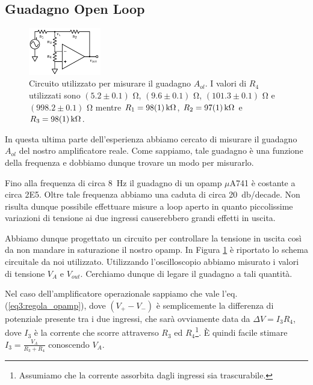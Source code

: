 \subsection{Guadagno Open Loop}
\label{par3:open}

\begin{figure}
  \begin{center}
    \includegraphics[width=0.280\textwidth]{../E03/latex/LF_ol.pdf}
  \end{center}
  \caption{Circuito utilizzato per misurare il guadagno $A_{ol}$. I valori di $R_4$ utilizzati sono $(5.2\pm 0.1)$ \si{\ohm},  $(9.6\pm0.1)$ \si{\ohm}, $(101.3\pm 0.1)$ \si{\ohm} e $(998.2\pm 0.1)$ \si{\ohm} mentre $R_1=\SI{98\pm1}{\kohm}$, $R_2=\SI{97\pm1}{\kohm}$ e $R_3=\SI{98\pm1}{\kohm}$.}
  \label{cir3:low_frequency}
\end{figure}

In questa ultima parte dell'esperienza abbiamo cercato di misurare il guadagno $A_{ol}$ del nostro amplificatore reale.
Come sappiamo, tale guadagno è una funzione della frequenza e dobbiamo dunque trovare un modo per misurarlo.

Fino alla frequenza di circa \SI{8}{\hertz} il guadagno di un opamp $\mu$A741 è costante a circa \num{2E5}.
Oltre tale frequenza abbiamo una caduta di circa \SI{20}{\decibel}/decade.
Non risulta dunque possibile effettuare misure a loop aperto in quanto piccolissime variazioni di tensione ai due ingressi causerebbero grandi effetti in uscita.

Abbiamo dunque progettato un circuito per controllare la tensione in uscita così da non mandare in saturazione il nostro opamp.
In Figura \ref{cir3:low_frequency} è riportato lo schema circuitale da noi utilizzato.
Utilizzando l'oscilloscopio abbiamo misurato i valori di tensione $V_A$ e $V_{out}$. Cerchiamo dunque di legare il guadagno a tali quantità.

Nel caso dell'amplificatore operazionale sappiamo che vale l'eq. (\ref{eq3:regola_opamp}), dove $(V_+-V_-)$ è semplicemente la differenza di potenziale presente tra i due ingressi, che sarà ovviamente data da $\Delta V = I_3R_4$, dove $I_3$ è la corrente che scorre attraverso $R_3$ ed $R_4$\footnote{Assumiamo che la corrente assorbita dagli ingressi sia trascurabile.}.
È quindi facile stimare $I_3=\frac{V_A}{R_3+R_4}$ conoscendo $V_A$.

